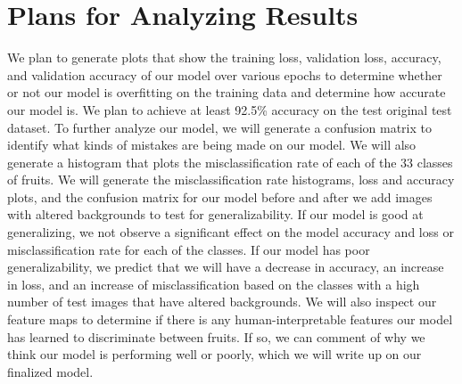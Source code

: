 \documentclass[11pt]{article}
\begin{document}
\section{Plans for Analyzing Results}

We plan to generate plots that show the training loss, validation loss, accuracy, and validation accuracy of our model over various epochs to determine whether or not our model is overfitting on the training data and determine how accurate our model is. We plan to achieve at least 92.5\% accuracy on the test original test dataset. To further analyze our model, we will generate a confusion matrix to identify what kinds of mistakes are being made on our model. We will also generate a histogram that plots the misclassification rate of each of the 33 classes of fruits. We will generate the misclassification rate histograms, loss and accuracy plots, and the confusion matrix for our model before and after we add images with altered backgrounds to test for generalizability. If our model is good at generalizing, we not observe a significant effect on the model accuracy and loss or misclassification rate for each of the classes. If our model has poor generalizability, we predict that we will have a decrease in accuracy, an increase in loss, and an increase of misclassification based on the classes with a high number of test images that have altered backgrounds. We will also inspect our feature maps to determine if there is any human-interpretable features our model has learned to discriminate between fruits. If so, we can comment of why we think our model is performing well or poorly, which we will write up on our finalized model.
\end{document}
